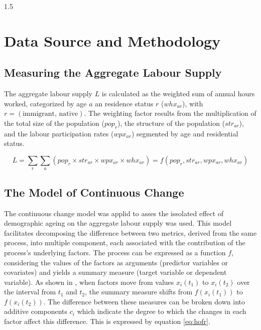 \documentclass{article}
\begin{document}
\begin{spacing}{1.5}
 

\section{Data Source and Methodology}\label{sec:lab_method}

  \subsection{Measuring the Aggregate Labour Supply}

 The aggregate labour supply \(L\) is calculated as the weighted sum of annual hours worked, categorized by age \(a\) an residence status \(r\) (\(whx_{ar}\)), with \(r = (\text{immigrant, native})\). The weighting factor results from the multiplication of the total size of the population (\(pop_{r}\)), the structure of the population (\(str_{ar}\)), and the labour participation rates (\(wpx_{ar}\)) segmented by age and residential status.


  \begin{equation}\label{eq:pclab}
    L = \displaystyle\sum_{r}\displaystyle\sum_{a}(pop_{r} \times str_{ar} \times wpx_{ar} \times whx_{ar}) = f(pop_{r}, str_{ar}, wpx_{ar}, whx_{ar})
  \end{equation}


  \subsection{The Model of Continuous Change}

The continuous change model was applid to asses the issolated effect of demographic ageing on the aggregate labour supply  \parencite{horiuchiDecompositionMethodBased2008} was used. This model facilitates decomposing the difference between two metrics, derived from the same process, into multiple component, each associated with the contribution of the process's underlying factors. The process can be expressed as a function \(f\), considering the values of the factors as arguments (predictor variables or covariates) and yields a summary measure (target variable or dependent variable). As shown in \textcite{horiuchiDecompositionMethodBased2008}, when factors move from values  \(x_i(t_1)\) to \(x_i(t_2)\) over the interval from  \(t_1\) and \(t_2\), the summary measure shifts from \(f(x_i(t_1))\) to \(f(x_i(t_2))\). The difference between these measures can be broken down into additive components \(c_{i}\) which indicate the degree to which the changes in each factor affect this difference. This is expressed by equation \eqref{eq:hofr}.
  

\end{spacing}
\end{document}
